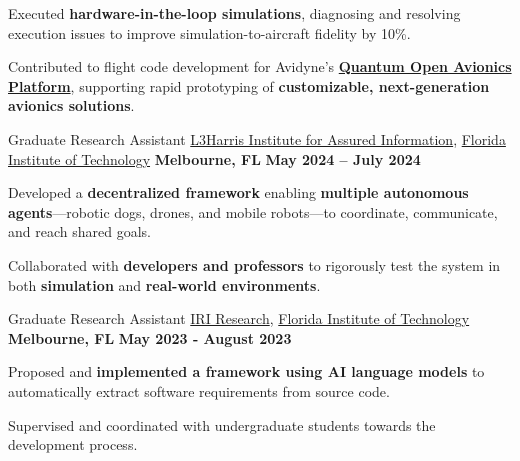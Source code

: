 \begin{cventries}
{\begin{cvitems}
  \item Executed \textbf{hardware-in-the-loop simulations}, diagnosing and resolving execution issues to improve simulation-to-aircraft fidelity by 10\%.
  \item Contributed to flight code development for Avidyne’s \href{https://quantum.avidyne.com/}{\textbf{Quantum Open Avionics Platform}}, supporting rapid prototyping of \textbf{customizable, next-generation avionics solutions}.
\end{cvitems}
}
\cventry
{Graduate Research Assistant}
{\href{https://research.fit.edu/l3hiai/}{L3Harris Institute for Assured Information}, \href{https://www.fit.edu}{Florida Institute of Technology}}
{\textbf{Melbourne, FL}}
{\textbf{May 2024 – July 2024}}
{
\begin{cvitems}
\item Developed a \textbf{decentralized framework} enabling \textbf{multiple autonomous agents}—robotic dogs, drones, and mobile robots—to coordinate, communicate, and reach shared goals.
\item Collaborated with \textbf{developers and professors} to rigorously test the system in both \textbf{simulation} and \textbf{real-world environments}.
\end{cvitems}
}

\cventry
{Graduate Research Assistant}
{\href{https://www.fit.edu/faculty-profiles/s/slhoub-khaled-/}{IRI Research},  \href{https://www.fit.edu}{Florida Institute of Technology}}
{\textbf{Melbourne, FL}}
{\textbf{May 2023 - August 2023}}
{
\begin{cvitems}
\item Proposed and \textbf{implemented a framework using AI language models} to automatically extract software requirements from source code.
\item Supervised and coordinated with undergraduate students towards the development process.
\end{cvitems}
}
\end{cventries}